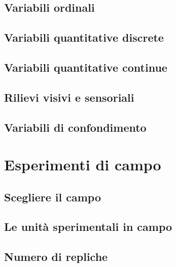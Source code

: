 \documentclass[a4paper,12pt,oneside]{book}
\begin{document}
\hypertarget{variabili-ordinali}{%
\subsection{Variabili ordinali}\label{variabili-ordinali}}

\hypertarget{variabili-quantitative-discrete}{%
\subsection{Variabili quantitative discrete}\label{variabili-quantitative-discrete}}

\hypertarget{variabili-quantitative-continue}{%
\subsection{Variabili quantitative continue}\label{variabili-quantitative-continue}}

\hypertarget{rilievi-visivi-e-sensoriali}{%
\subsection{Rilievi visivi e sensoriali}\label{rilievi-visivi-e-sensoriali}}

\hypertarget{variabili-di-confondimento}{%
\subsection{Variabili di confondimento}\label{variabili-di-confondimento}}

\hypertarget{esperimenti-di-campo}{%
\section{Esperimenti di campo}\label{esperimenti-di-campo}}

\hypertarget{scegliere-il-campo}{%
\subsection{Scegliere il campo}\label{scegliere-il-campo}}

\hypertarget{le-unituxe0-sperimentali-in-campo}{%
\subsection{Le unità sperimentali in campo}\label{le-unituxe0-sperimentali-in-campo}}

\hypertarget{numero-di-repliche}{%
\subsection{Numero di repliche}\label{numero-di-repliche}}
\end{document}

